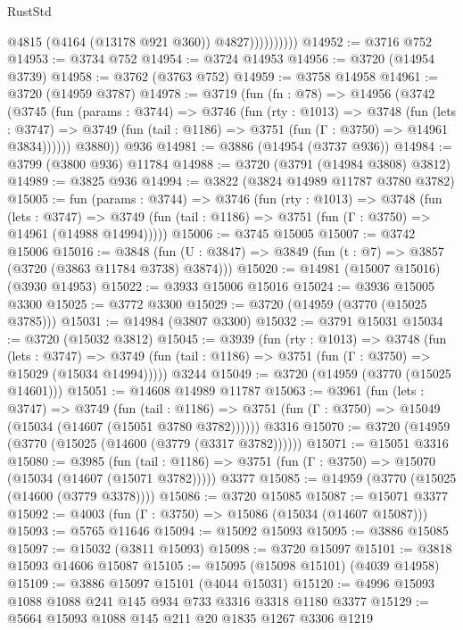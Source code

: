 \begin{lexlean}{RustStd}
\begin{coremodule}
                        @4815
                        (@4164 (@13178 @921 @360))
                        @4827))))))))))
@14952 := @3716 @752
@14953 := @3734 @752
@14954 := @3724 @14953
@14956 := @3720 (@14954 @3739)
@14958 := @3762 (@3763 @752)
@14959 := @3758 @14958
@14961 := @3720 (@14959 @3787)
@14978 := @3719
    (fun (fn : @78) =>
    @14956
      (@3742
        (@3745
          (fun (params : @3744) =>
          @3746
            (fun (rty : @1013) =>
            @3748
              (fun (lets : @3747) =>
              @3749 (fun (tail : @1186) => @3751 (fun (Γ : @3750) => @14961 @3834))))))
        @3880))
    @936
@14981 := @3886 (@14954 (@3737 @936))
@14984 := @3799 (@3800 @936) @11784
@14988 := @3720 (@3791 (@14984 @3808) @3812)
@14989 := @3825 @936
@14994 := @3822 (@3824 @14989 @11787 @3780 @3782)
@15005 := fun (params : @3744) =>
  @3746
    (fun (rty : @1013) =>
    @3748
      (fun (lets : @3747) =>
      @3749 (fun (tail : @1186) => @3751 (fun (Γ : @3750) => @14961 (@14988 @14994)))))
@15006 := @3745 @15005
@15007 := @3742 @15006
@15016 := @3848
    (fun (U : @3847) => @3849 (fun (t : @7) => @3857 (@3720 (@3863 @11784 @3738) @3874)))
@15020 := @14981 (@15007 @15016) (@3930 @14953)
@15022 := @3933 @15006 @15016
@15024 := @3936 @15005 @3300
@15025 := @3772 @3300
@15029 := @3720 (@14959 (@3770 (@15025 @3785)))
@15031 := @14984 (@3807 @3300)
@15032 := @3791 @15031
@15034 := @3720 (@15032 @3812)
@15045 := @3939
    (fun (rty : @1013) =>
    @3748
      (fun (lets : @3747) =>
      @3749 (fun (tail : @1186) => @3751 (fun (Γ : @3750) => @15029 (@15034 @14994)))))
    @3244
@15049 := @3720 (@14959 (@3770 (@15025 @14601)))
@15051 := @14608 @14989 @11787
@15063 := @3961
    (fun (lets : @3747) =>
    @3749
      (fun (tail : @1186) =>
      @3751 (fun (Γ : @3750) => @15049 (@15034 (@14607 (@15051 @3780 @3782))))))
    @3316
@15070 := @3720 (@14959 (@3770 (@15025 (@14600 (@3779 (@3317 @3782))))))
@15071 := @15051 @3316
@15080 := @3985
    (fun (tail : @1186) => @3751 (fun (Γ : @3750) => @15070 (@15034 (@14607 (@15071 @3782)))))
    @3377
@15085 := @14959 (@3770 (@15025 (@14600 (@3779 @3378))))
@15086 := @3720 @15085
@15087 := @15071 @3377
@15092 := @4003 (fun (Γ : @3750) => @15086 (@15034 (@14607 @15087)))
@15093 := @5765 @11646
@15094 := @15092 @15093
@15095 := @3886 @15085
@15097 := @15032 (@3811 @15093)
@15098 := @3720 @15097
@15101 := @3818 @15093 @14606 @15087
@15105 := @15095 (@15098 @15101) (@4039 @14958)
@15109 := @3886 @15097 @15101 (@4044 @15031)
@15120 := @4996 @15093 @1088 @1088 @241 @145 @934 @733 @3316 @3318 @1180 @3377
@15129 := @5664 @15093 @1088 @145 @211 @20 @1835 @1267 @3306 @1219

\end{coremodule}
\end{lexlean}
